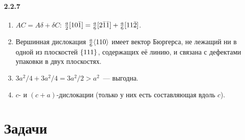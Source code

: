 {\paragraph{2.2.7}
\begin{enumerate}[label=\arabic*.]
\item $AC=A\delta+\delta C$: $\frac a2[10\bar{1}]=\frac a6[2\bar{1}\bar{1}]+\frac a6[11\bar{2}]$.
\item Вершинная дислокация $\frac a6\langle 110\rangle$ имеет вектор Бюргерса, не
лежащий ни в одной из плоскостей $\{111\}$, содержащих её линию, и
связана с дефектами упаковки в двух плоскостях.
\item $3a^2/4+3a^2/4=3a^2/2>a^2$~— выгодна.
\item $c$- и $(c+a)$-дислокации (только у них есть составляющая вдоль $c$).
\end{enumerate}
}

\section*{Задачи}

